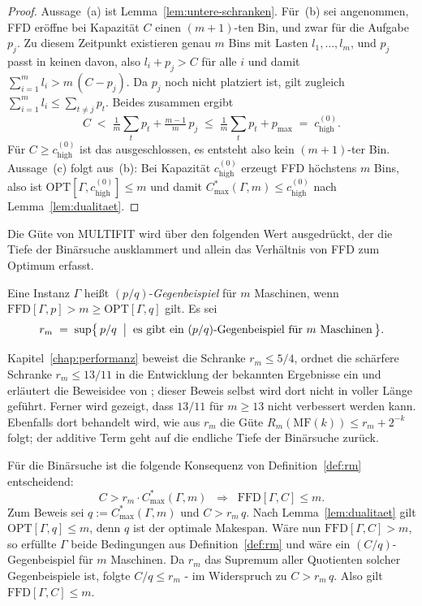 \begin{proof}
Aussage~(a) ist Lemma~\ref{lem:untere-schranken}.
Für~(b) sei angenommen, FFD eröffne bei Kapazität $C$ einen $(m+1)$-ten Bin, und zwar für die
Aufgabe $p_j$.
Zu diesem Zeitpunkt existieren genau $m$ Bins mit Lasten $l_1, \ldots, l_m$, und $p_j$ passt in
keinen davon, also $l_i + p_j > C$ für alle $i$ und damit $\sum_{i=1}^{m} l_i > m\,(C - p_j)$.
Da $p_j$ noch nicht platziert ist, gilt zugleich
$\sum_{i=1}^{m} l_i \le \sum_{t \ne j} p_t$.
Beides zusammen ergibt
\[
  C \;<\; \tfrac{1}{m}\textstyle\sum_{t} p_t + \tfrac{m-1}{m}\,p_j
  \;\le\; \tfrac{1}{m}\textstyle\sum_{t} p_t + p_{\max}
  \;=\; c_{\mathrm{high}}^{(0)} .
\]
Für $C \ge c_{\mathrm{high}}^{(0)}$ ist das ausgeschlossen, es entsteht also kein $(m+1)$-ter Bin.
Aussage~(c) folgt aus~(b): Bei Kapazität $c_{\mathrm{high}}^{(0)}$ erzeugt FFD höchstens $m$ Bins,
also ist $\mathrm{OPT}[\Gamma, c_{\mathrm{high}}^{(0)}] \le m$ und damit
$C^{*}_{\max}(\Gamma, m) \le c_{\mathrm{high}}^{(0)}$ nach Lemma~\ref{lem:dualitaet}.
\end{proof}

Die Güte von MULTIFIT wird über den folgenden Wert ausgedrückt, der die Tiefe der Binärsuche
ausklammert und allein das Verhältnis von FFD zum Optimum erfasst.

\begin{definition}
\label{def:rm}
Eine Instanz $\Gamma$ heißt $(p/q)$-\emph{Gegenbeispiel} für $m$ Maschinen, wenn
$\mathrm{FFD}[\Gamma, p] > m \ge \mathrm{OPT}[\Gamma, q]$ gilt.
Es sei
\[
  r_m \;=\; \sup\bigl\{\, p/q \;\bigm|\; \text{es gibt ein } (p/q)\text{-Gegenbeispiel für }
  m \text{ Maschinen} \,\bigr\}.
\]
\end{definition}

Kapitel~\ref{chap:performanz} beweist die Schranke $r_m \le 5/4$, ordnet die schärfere Schranke
$r_m \le 13/11$ in die Entwicklung der bekannten Ergebnisse ein und erläutert die Beweisidee von
\textcite{cao1995}; dieser Beweis selbst wird dort nicht in voller Länge geführt.
Ferner wird gezeigt, dass $13/11$ für $m \ge 13$ nicht verbessert werden kann.
Ebenfalls dort behandelt wird, wie aus $r_m$ die Güte $R_m(\mathrm{MF}(k)) \le r_m + 2^{-k}$
folgt; der additive Term geht auf die endliche Tiefe der Binärsuche zurück.

Für die Binärsuche ist die folgende Konsequenz von Definition~\ref{def:rm} entscheidend:
\begin{equation}
  C > r_m \cdot C^{*}_{\max}(\Gamma, m) \;\;\Longrightarrow\;\; \mathrm{FFD}[\Gamma, C] \le m.
  \label{eq:ffd-akzeptiert}
\end{equation}
Zum Beweis sei $q := C^{*}_{\max}(\Gamma, m)$ und $C > r_m \, q$.
Nach Lemma~\ref{lem:dualitaet} gilt $\mathrm{OPT}[\Gamma, q] \le m$, denn $q$ ist der optimale
Makespan.
Wäre nun $\mathrm{FFD}[\Gamma, C] > m$, so erfüllte $\Gamma$ beide Bedingungen aus
Definition~\ref{def:rm} und wäre ein $(C/q)$-Gegenbeispiel für $m$ Maschinen.
Da $r_m$ das Supremum aller Quotienten solcher Gegenbeispiele ist, folgte $C/q \le r_m$ -
im Widerspruch zu $C > r_m\, q$.
Also gilt $\mathrm{FFD}[\Gamma, C] \le m$.


